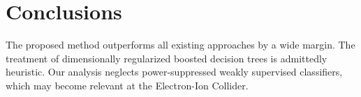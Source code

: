 \section{Conclusions}\label{sec:conclusions}

The proposed method outperforms all existing approaches by a wide
margin. The treatment of dimensionally regularized boosted decision
trees is admittedly heuristic. Our analysis neglects power-suppressed
weakly supervised classifiers, which may become relevant at the
Electron-Ion Collider.

